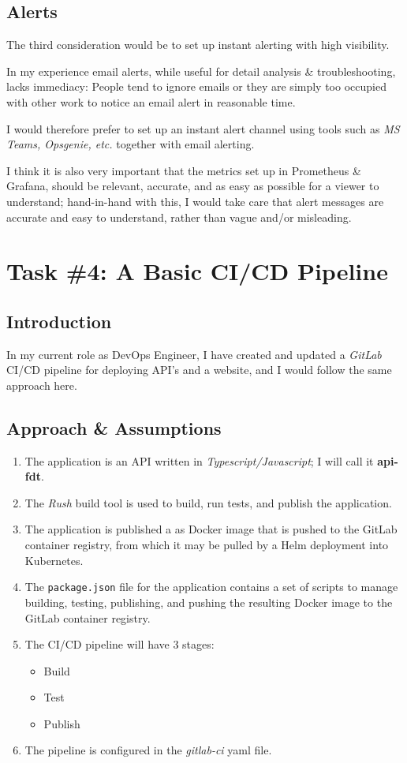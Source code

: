 \documentclass[oneside,titlepage,fleqn,a4paper]{article}
\begin{document}
\subsection{Alerts}
The third consideration would be to set up instant alerting with high visibility.

In my experience email alerts, while useful for detail analysis \& troubleshooting, lacks immediacy: People tend to ignore emails or they are simply too occupied with other work to notice an email alert in reasonable time.

I would therefore prefer to set up an instant alert channel using tools such as \emph{MS Teams, Opsgenie, etc.} together with email alerting.

I think it is also very important that the metrics set up in Prometheus \& Grafana, should be relevant, accurate, and as easy as possible for a viewer to understand; hand-in-hand with this, I would take care that alert messages are accurate and easy to understand, rather than vague and/or misleading.

\newpage
\section{Task \#4: A Basic CI/CD Pipeline}
\subsection{Introduction}
In my current role as DevOps Engineer, I have created and updated a \emph{GitLab} CI/CD pipeline for deploying API's and a website, and I would follow the same approach here.

\subsection{Approach \& Assumptions}
\begin{enumerate}
\item The application is an API written in \emph{Typescript/Javascript}; I will call it \textbf{api-fdt}.
\item The \emph{Rush} build tool is used to build, run tests, and publish the application.
\item The application is published a as Docker image that is pushed to the GitLab container registry, from which it may be pulled by a Helm deployment into Kubernetes.
\item The \texttt{package.json} file for the application contains a set of scripts to manage building, testing, publishing, and pushing the resulting Docker image to the GitLab container registry.
\item The CI/CD pipeline will have 3 stages:
\begin{itemize}
\item Build
\item Test
\item Publish
\end{itemize}
\item The pipeline is configured in the \emph{gitlab-ci} yaml file.
\end{enumerate}
\end{document}
